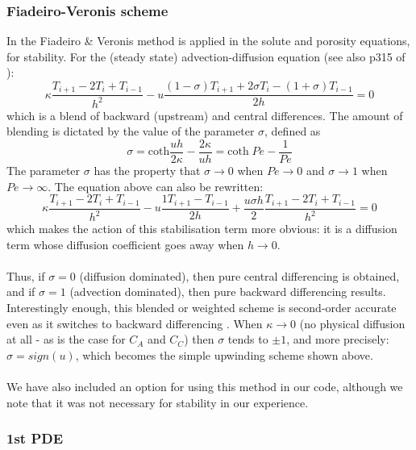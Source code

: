 \documentclass[a4paper]{article}
\begin{document}
\subsubsection*{Fiadeiro-Veronis scheme}
In \cite{lheu18} the Fiadeiro \& Veronis method \cite{five77,wrig92} is applied in the solute and porosity equations, for stability.  For the (steady state) advection-diffusion equation (see also p315 of \cite{boudreau}):
\[
\kappa \frac{T_{i+1}-2T_i + T_{i-1}}{h^2}
- u \frac{(1-\sigma) T_{i+1}+2\sigma T_i -(1+\sigma)T_{i-1}}{2 h} = 0
\]
which is a blend of backward (upstream) and central differences. The amount of blending is dictated by the value of the parameter $\sigma$, defined as
\[
\sigma 
= \text{coth} \frac{u h}{2 \kappa} - \frac{2 \kappa}{u h}
= \text{coth} \; Pe  - \frac{1}{Pe}
\]
The parameter $\sigma$ has the property that
$\sigma \rightarrow 0$ when $Pe \rightarrow 0$ and 
$\sigma \rightarrow 1$ when $Pe \rightarrow \infty$.
The equation above can also be rewritten:
\[
\kappa \frac{T_{i+1}-2T_i + T_{i-1}}{h^2}
- u \frac{1 T_{i+1}-T_{i-1}}{2 h} 
+ \frac{u \sigma h}{2} \frac{T_{i+1}-2 T_i +T_{i-1}}{h^2} = 0
\]
which makes the action of this stabilisation term more obvious: it is a diffusion term whose 
diffusion coefficient goes away when $h\rightarrow 0$.\\\\
Thus, if $\sigma = 0$ (diffusion dominated), then pure central differencing is obtained, and if $\sigma = 1$ (advection dominated), then pure backward differencing results. Interestingly enough, this blended or weighted scheme is second-order accurate even as it switches to backward differencing \cite{five77}.  When $\kappa \rightarrow 0$ (no physical diffusion at all - as is the case for $C_A$ and $C_C$) then $\sigma$ tends to $\pm 1$, and more precisely: $\sigma = sign(u)$, which becomes the simple upwinding scheme shown above.\\\\
We have also included an option for using this method in our code, although we note that it was not necessary for stability in our experience.


\subsubsection*{1st PDE}
\end{document}
